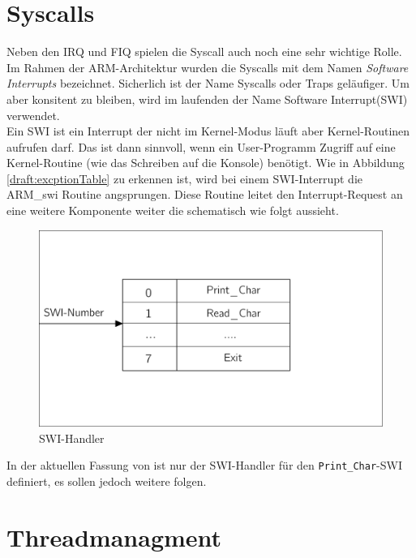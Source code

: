 \section{Syscalls}
Neben den IRQ und FIQ spielen die Syscall auch noch eine sehr wichtige Rolle. Im Rahmen der ARM-Architektur wurden die Syscalls mit dem Namen \textit{Software Interrupts} bezeichnet. Sicherlich ist der Name Syscalls oder Traps gel\"aufiger. Um aber konsitent zu bleiben, wird im laufenden der Name Software Interrupt(SWI) verwendet.\\
Ein SWI ist ein Interrupt der nicht im Kernel-Modus l\"auft aber Kernel-Routinen aufrufen darf. Das ist dann sinnvoll, wenn ein User-Programm Zugriff auf eine Kernel-Routine (wie das Schreiben auf die Konsole) ben\"otigt. Wie in Abbildung \ref{draft:excptionTable} zu erkennen ist, wird bei einem SWI-Interrupt die ARM\_swi Routine angsprungen. Diese Routine leitet den Interrupt-Request an eine weitere Komponente weiter die schematisch wie folgt aussieht.
\begin{figure}[H]
	\begin{center}	
	\caption{SWI-Handler}
	\includegraphics[scale=0.60]{common/swihandler.pdf}
	\end{center}
\end{figure}
\noindent
In der aktuellen Fassung von \mops ist nur der SWI-Handler f\"ur den \texttt{Print\_Char}-SWI definiert, es sollen jedoch weitere folgen.
\section{Threadmanagment}

